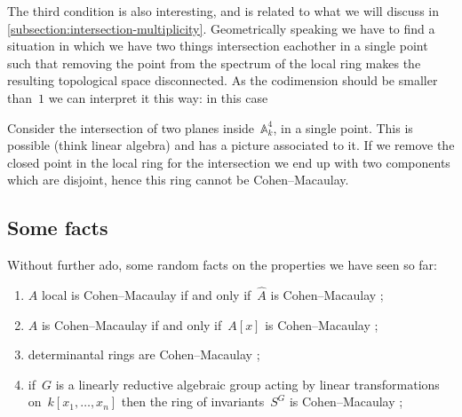 \documentclass[10pt,a4paper]{article}
\begin{document}
The third condition is also interesting, and is related to what we will discuss in \cref{subsection:intersection-multiplicity}. Geometrically speaking we have to find a situation in which we have two things intersection eachother in a single point such that removing the point from the spectrum of the local ring makes the resulting topological space disconnected. As the codimension should be smaller than~$1$ we can interpret it this way: in this case 
\begin{example}
  Consider the intersection of two planes inside~$\mathbb{A}_k^4$, in a single point. This is possible (think linear algebra) and has a picture associated to it. If we remove the closed point in the local ring for the intersection we end up with two components which are disjoint, hence this ring cannot be Cohen--Macaulay.
\end{example}

\subsection{Some facts}
\label{subsections:facts}
Without further ado, some random facts on the properties we have seen so far:
\begin{enumerate}
  \item $A$ local is Cohen--Macaulay if and only if~$\hat{A}$ is Cohen--Macaulay \cite[proposition 18.8]{eisenbud-commutative-algebra};
  \item $A$ is Cohen--Macaulay if and only if~$A[x]$ is Cohen--Macaulay \cite[proposition 18.9]{eisenbud-commutative-algebra};
  \item determinantal rings are Cohen--Macaulay \cite[theorem 18.18]{eisenbud-commutative-algebra};
  \item if~$G$ is a linearly reductive algebraic group acting by linear transformations on~$k[x_1,\dotsc,x_n]$ then the ring of invariants~$S^G$ is Cohen--Macaulay \cite[\S 18.5]{eisenbud-commutative-algebra};
\end{enumerate}
\end{document}

